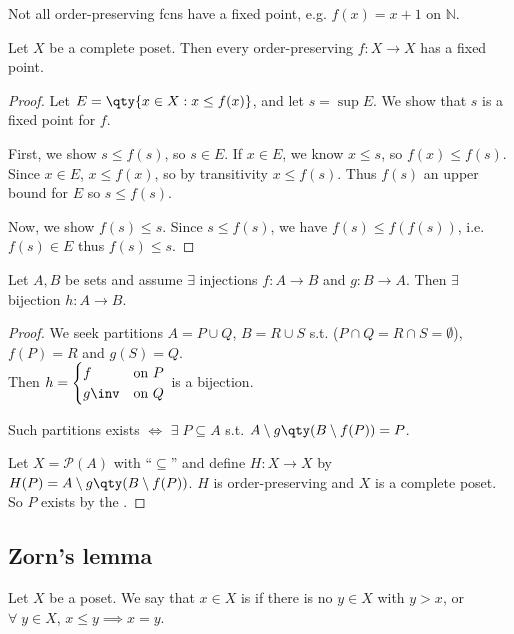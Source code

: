 Not all order-preserving fcns have a fixed point, e.g. $f(x) = x + 1$ on $\mathbb N$.

\begin{theorem} \label{thm:fixed}
    Let $X$ be a complete poset.
    Then every order-preserving $f \colon X \to X$ has a fixed point.
\end{theorem}

\begin{proof}
    Let $E = \qty{x \in X : x \leq f(x)}$, and let $s = \sup E$.
    We show that $s$ is a fixed point for $f$.

    First, we show $s \leq f(s)$, so $s \in E$.
    If $x \in E$, we know $x \leq s$, so $f(x) \leq f(s)$.
    Since $x \in E$, $x \leq f(x)$, so by transitivity $x \leq f(s)$.
    Thus $f(s)$ an upper bound for $E$ so $s \leq f(s)$.

    Now, we show $f(s) \leq s$.
    Since $s \leq f(s)$, we have $f(s) \leq f(f(s))$, i.e. $f(s) \in E$ thus $f(s) \leq s$.
\end{proof}

\begin{corollary}
    Let $A, B$ be sets and assume $\exists$ injections $f \colon A \to B$ and $g \colon B \to A$.
    Then $\exists$ bijection $h : A \to B$.
\end{corollary}

\begin{proof}
    We seek partitions $A = P \cup Q$, $B = R \cup S$ s.t. ($P \cap Q = R \cap S = \emptyset$), $f(P) = R$ and $g(S) = Q$. \\
    Then $h = \begin{cases}
        f & \text{on } P \\
        g\inv & \text{on } Q
    \end{cases}$ is a bijection.

    Such partitions exists $\iff$ $\exists \; P \subseteq A$ s.t. $A \setminus g\qty(B \setminus f(P)) = P$.

    Let $X = \mathcal{P}(A)$ with ``$\subseteq$'' and define $H : X \to X$ by $H(P) = A \setminus g\qty(B \setminus f(P))$.
    $H$ is order-preserving and $X$ is a complete poset.
    So $P$ exists by the .
\end{proof}

\subsection{Zorn's lemma}
\begin{definition}[Maximal]
    Let $X$ be a poset.
    We say that $x \in X$ is  if there is no $y \in X$ with $y > x$, or $\forall \; y \in X$, $x \leq y \implies x = y$.
\end{definition}

